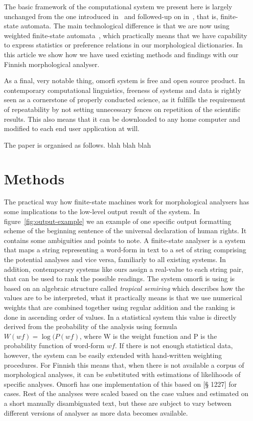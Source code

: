 \documentclass[a4paper,12pt]{article}
\begin{document}
The basic framework of the computational system we present here is largely
unchanged from the one introduced in~\cite{koskenniemi1983twolevel} and
followed-up on in~\cite{pirinen2008}, that is, finite-state automata. The main
technological difference is that we are now using weighted finite-state 
automata~\cite{openfst}, which practically means that we have capability to
express statistics or preference relations in our morphological dictionaries.
In this article we show how we have used existing methods and findings with
our Finnish morphological analyser.

As a final, very notable thing, omorfi system is free and open source product.
In contemporary computational linguistics, freeness of systems and data is
rightly seen as a cornerstone of properly conducted science, as it fulfills the
requirement of repeatability by not setting unnecessary fences on repetition of
the scientific results. This also means that it can be downloaded to any home
computer and modified to each end user application at will.

The paper is organised as follows. blah blah blah

\section{Methods}

The practical way how finite-state machines work for morphological analysers
has some implications to the low-level output result of the system. In
figure~\ref{fig:output-example} we an example of one specific output formatting
scheme of the beginning sentence of the universal declaration of human rights.
It contains some ambiguities and points to note. A finite-state analyser is a
system that maps a string representing a word-form in text to a set of string
comprising the potential analyses and vice versa, familiarly to all existing
systems. In addition, contemporary systems like ours assign a real-value to
each string pair, that can be used to rank the possible readings.  The system
omorfi is using is based on an algebraic structure called \emph{tropical
semiring} which describes how the values are to be interpreted, what it
practically means is that we use numerical weights that are combined together
using regular addition and the ranking is done in ascending order of values.
In a statistical system this value is directly derived from the probability of
the analysis using formula $W(wf) = \log(P(wf)$, where W is the weight function
and P is the probability function of word-form $wf$. If there is not enough
statistical data, however, the system can be easily extended with hand-written
weighting procedures. For Finnish this means that, when there is not available
a corpus of morphological analyses, it can be substituted with estimations of
likelihoods of specific analyses. Omorfi has one implementation of this based
on \cite{visk}[§ 1227] for cases. Rest of the analyses were scaled based on the
case values and estimated on a short manually disambiguated text, but these are
subject to vary between different versions of analyser as more data becomes
available.
\end{document}

